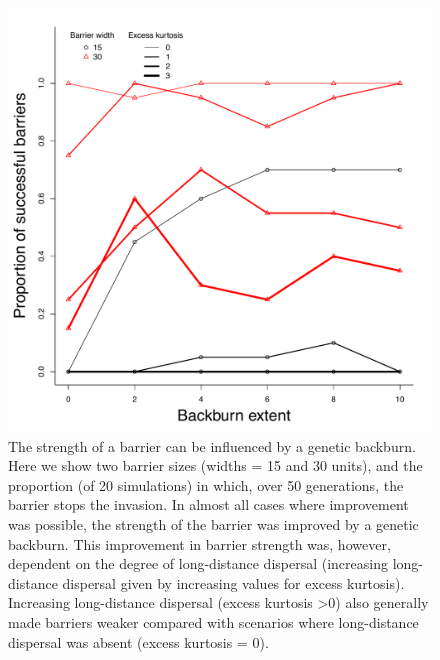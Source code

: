 \documentclass{article}
\begin{document}
 \begin{figure}[h!]
\begin{center}
\includegraphics[width=0.7\columnwidth]{BarSimsVarv.pdf}
\caption{\label{fig:varv}
The strength of a barrier can be influenced by a genetic backburn.  Here we show two barrier sizes (widths = 15 and 30 units), and the proportion (of 20 simulations) in which, over 50 generations, the barrier stops the invasion.  In almost all cases where improvement was possible, the strength of the barrier was improved by a genetic backburn.  This improvement in barrier strength was, however, dependent on the degree of long-distance dispersal (increasing long-distance dispersal given by increasing values for excess kurtosis).  Increasing long-distance dispersal (excess kurtosis \textgreater 0) also generally made barriers weaker compared with scenarios where long-distance dispersal was absent (excess kurtosis = 0).}
\end{center}
\end{figure}
\end{document}
